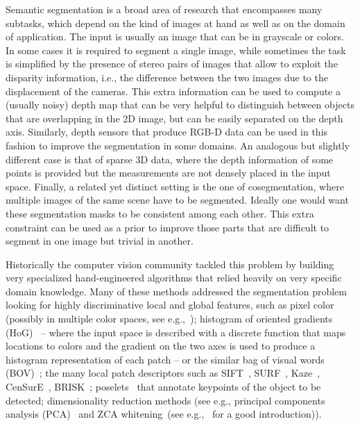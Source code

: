 Semantic segmentation is a broad area of research that encompasses many
subtasks, which depend on the kind of images at hand as well as on the domain
of application. The input is usually an image that can be in grayscale or
colors.  In some cases it is required to segment a single image, while
sometimes the task is simplified by the presence of stereo pairs of images that
allow to exploit the disparity information, i.e., the difference between the
two images due to the displacement of the cameras. This extra information can
be used to compute a (usually noisy) depth map that can be very helpful to
distinguish between objects that are overlapping in the 2D image, but can be
easily separated on the depth axis. Similarly, depth sensors that produce RGB-D
data can be used in this fashion to improve the segmentation in some domains.
An analogous but slightly different case is that of sparse 3D data, where the
depth information of some points is provided but the measurements are not
densely placed in the input space.
Finally, a related yet distinct setting is the one of cosegmentation, where
multiple images of the same scene have to be segmented. Ideally one would want
these segmentation masks to be consistent among each other. This extra
constraint can be used as a prior to improve those parts that are difficult to
segment in one image but trivial in another.

Historically the computer vision community tackled this problem by building
very specialized hand-engineered algorithms that relied heavily on very
specific domain knowledge. Many of these methods addressed the segmentation
problem looking for highly discriminative local and global features, such as
pixel color (possibly in multiple color spaces, see e.g.,~\cite{
cheng2001color}); histogram of oriented gradients (HoG)~\citep{Dalal05,
bourdev2010detecting,felzenszwalb2010object} -- where the input space is
described with a discrete function that maps locations to colors and the
gradient on the two axes is used to produce a histogram representation of each
patch -- or the similar bag of visual words (BOV)~\citep{csurka2004visual}; the
many local patch descriptors such as SIFT~\citep{lowe2004distinctive},
SURF~\citep{bay2008speeded}, Kaze~\citep{alcantarilla2012kaze}, CenSurE~\citep{
agrawal2008censure}, BRISK~\citep{leutenegger2011brisk}; poselets~\citep{
brox2011object,bourdev2010detecting} that annotate keypoints of the object to
be detected; dimensionality reduction methods (see e.g., principal components
analysis (PCA)~\cite{smith2002tutorial,shlens2014tutorial,chen2011pixel} and
ZCA whitening~(see e.g.,~\cite{KrizhevskyHinton2009} for a good introduction)).

